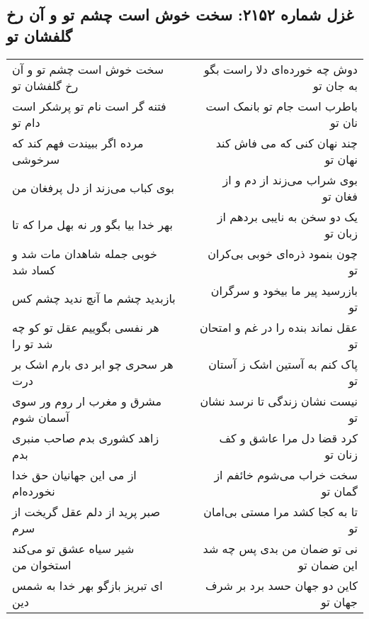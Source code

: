 \begin{center}
\section*{غزل شماره ۲۱۵۲: سخت خوش است چشم تو و آن رخ گلفشان تو}
\label{sec:2152}
\begin{longtable}{l p{0.5cm} r}
سخت خوش است چشم تو و آن رخ گلفشان تو
&&
دوش چه خورده‌ای دلا راست بگو به جان تو
\\
فتنه گر است نام تو پرشکر است دام تو
&&
باطرب است جام تو بانمک است نان تو
\\
مرده اگر ببیندت فهم کند که سرخوشی
&&
چند نهان کنی که می فاش کند نهان تو
\\
بوی کباب می‌زند از دل پرفغان من
&&
بوی شراب می‌زند از دم و از فغان تو
\\
بهر خدا بیا بگو ور نه بهل مرا که تا
&&
یک دو سخن به نایبی بردهم از زبان تو
\\
خوبی جمله شاهدان مات شد و کساد شد
&&
چون بنمود ذره‌ای خوبی بی‌کران تو
\\
بازبدید چشم ما آنچ ندید چشم کس
&&
بازرسید پیر ما بیخود و سرگران تو
\\
هر نفسی بگوییم عقل تو کو چه شد تو را
&&
عقل نماند بنده را در غم و امتحان تو
\\
هر سحری چو ابر دی بارم اشک بر درت
&&
پاک کنم به آستین اشک ز آستان تو
\\
مشرق و مغرب ار روم ور سوی آسمان شوم
&&
نیست نشان زندگی تا نرسد نشان تو
\\
زاهد کشوری بدم صاحب منبری بدم
&&
کرد قضا دل مرا عاشق و کف زنان تو
\\
از می این جهانیان حق خدا نخورده‌ام
&&
سخت خراب می‌شوم خائفم از گمان تو
\\
صبر پرید از دلم عقل گریخت از سرم
&&
تا به کجا کشد مرا مستی بی‌امان تو
\\
شیر سیاه عشق تو می‌کند استخوان من
&&
نی تو ضمان من بدی پس چه شد این ضمان تو
\\
ای تبریز بازگو بهر خدا به شمس دین
&&
کاین دو جهان حسد برد بر شرف جهان تو
\\
\end{longtable}
\end{center}
